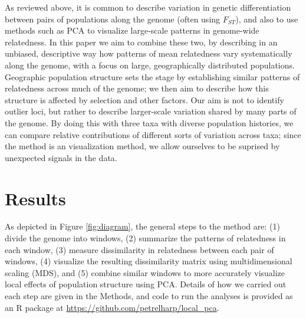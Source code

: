 \documentclass[11pt, oneside]{article}   	%
\begin{document}
As reviewed above,
it is common to describe variation in genetic differentiation between pairs of populations along the genome (often using $F_{ST}$),
and also to use methods such as PCA to visualize large-scale patterns in genome-wide relatedness.
In this paper we aim to combine these two, by describing in an unbiased, descriptive way
how patterns of mean relatedness vary systematically along the genome, with a focus on large, geographically distributed populations.
Geographic population structure sets the stage by establishing similar patterns of relatedness across much of the genome;
we then aim to describe how this structure is affected by selection and other factors.
Our aim is not to identify outlier loci,
but rather to describe larger-scale variation shared by many parts of the genome.
By doing this with three taxa with diverse population histories,
we can compare relative contributions of different sorts of variation across taxa;
since the method is an visualization method, we allow ourselves to be suprised by unexpected signals in the data.


\section{Results}

As depicted in Figure \ref{fig:diagram}, the general steps to the method are:
(1) divide the genome into windows,
(2) summarize the patterns of relatedness in each window,
(3) measure dissimilarity in relatedness between each pair of windows,
(4) visualize the resulting dissimilarity matrix using multidimensional scaling (MDS),
and (5) combine similar windows to more accurately visualize local effects of population structure using PCA.
Details of how we carried out each step are given in the Methods,
and code to run the analyses is provided as an R package at \url{https://github.com/petrelharp/local_pca}.
\end{document}
